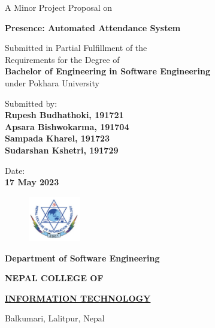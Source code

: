 \documentclass[a4paper 14pt]{article}
\begin{document}
\begin{titlepage}
	\begin{center}
	
	\large%
	A Minor Project Proposal on
	
	\huge %
	\textbf{Presence: Automated Attendance System}

	\vfill
	
	\large %
	Submitted in Partial Fulfillment of the \\ 
	Requirements for the Degree of \\ 
	\textbf {Bachelor of Engineering in Software Engineering} \\
	under Pokhara University
	
	\vfill
	
	Submitted by: \\ 
	\textbf {Rupesh Budhathoki, 191721} \\
	\textbf {Apsara Bishwokarma, 191704} \\
	\textbf {Sampada Kharel, 191723} \\
	\textbf {Sudarshan Kshetri, 191729} \\
 
	\vfill
	
	
	
	Date: \\
	\textbf {17 May 2023}
	
	\vfill
	
	\end{center}
	
	\begin{figure}
	\centering
	\includegraphics[width=0.2\textwidth]{figures/college-logo.png}
	\end{figure}
	
	\selectfont
	
	\textbf {Department of Software Engineering}  
	
        \LARGE %
	\textbf {NEPAL COLLEGE OF} 
	
	\LARGE %
	\textbf {\underline {INFORMATION TECHNOLOGY} }
	
	\small %
	Balkumari, Lalitpur, Nepal
	
	
\end{titlepage}
\end{document}
